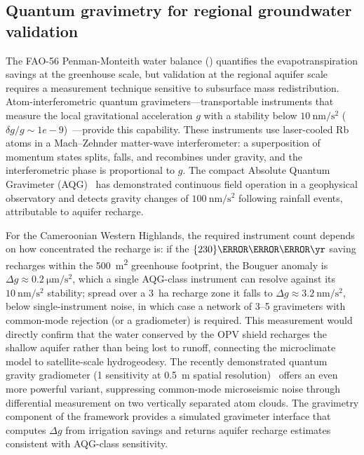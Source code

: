\documentclass[11pt,a4paper]{article}
\begin{document}
\subsection{Quantum gravimetry for regional groundwater validation}
\label{SI-sec:gravimetry}

The FAO-56 Penman-Monteith water balance () quantifies the evapotranspiration savings at the greenhouse scale, but validation at the regional aquifer scale requires a measurement technique sensitive to subsurface mass redistribution. Atom-interferometric quantum gravimeters---transportable instruments that measure the local gravitational acceleration $g$ with a stability below $\qty{10}{\nm\per\s\squared}$ ($\delta g/g \sim {1e-9}$)~\cite{Menoret2018}---provide this capability. These instruments use laser-cooled Rb atoms in a Mach--Zehnder matter-wave interferometer: a superposition of momentum states splits, falls, and recombines under gravity, and the interferometric phase is proportional to $g$. The compact Absolute Quantum Gravimeter (AQG)~\cite{Menoret2018} has demonstrated continuous field operation in a geophysical observatory and detects gravity changes of $\qty{100}{\nm\per\s\squared}$ following rainfall events, attributable to aquifer recharge.

For the Cameroonian Western Highlands, the required instrument count depends on how concentrated the recharge is: if the $\qty{230}{\m\cubed\per\yr}$ saving recharges within the \qty{500}{\m\squared} greenhouse footprint, the Bouguer anomaly is $\Delta g \approx \qty{0.2}{\micro\m\per\s\squared}$, which a single AQG-class instrument can resolve against its $\qty{10}{\nm\per\s\squared}$ stability; spread over a \qty{3}{\hectare} recharge zone it falls to $\Delta g \approx \qty{3.2}{\nm\per\s\squared}$, below single-instrument noise, in which case a network of 3--5 gravimeters with common-mode rejection (or a gradiometer) is required. This measurement would directly confirm that the water conserved by the OPV shield recharges the shallow aquifer rather than being lost to runoff, connecting the microclimate model to satellite-scale hydrogeodesy. The recently demonstrated quantum gravity gradiometer (\qty{1}{} sensitivity at \qty{0.5}{\m} spatial resolution)~\cite{Stray2022} offers an even more powerful variant, suppressing common-mode microseismic noise through differential measurement on two vertically separated atom clouds. The gravimetry component of the framework provides a simulated gravimeter interface that computes $\Delta g$ from irrigation savings and returns aquifer recharge estimates consistent with AQG-class sensitivity.
\end{document}
